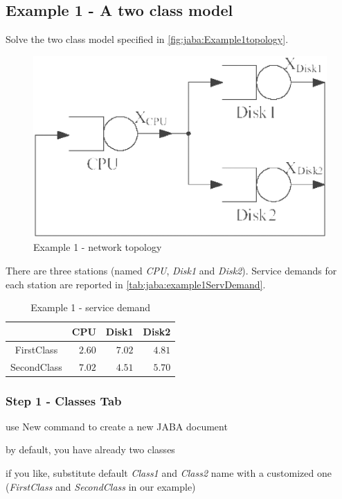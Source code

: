 \subsection{Example 1 - A two class model}
\label{sec:jaba:example1} Solve the two class model specified in
\autoref{fig:jaba:Example1topology}.
\begin{figure}[htbp]
    \begin{center}
        \includegraphics[scale=.35]{img/jaba/example1}
    \end{center}
    \caption{Example 1 - network topology}
    \label{fig:jaba:Example1topology}
\end{figure}

There are three stations (named
\emph{CPU}, \emph{Disk1} and \emph{Disk2}). 
Service demands for each station are reported in
\autoref{tab:jaba:example1ServDemand}.

\begin{table}[htbp]
\begin{center}
\begin{tabular}{c|r|r|r|}
& \multicolumn{1}{c|}{CPU} & \multicolumn{1}{c|}{Disk1} & \multicolumn{1}{c|}{Disk2} \\
\hline
FirstClass & $2.60$ & $7.02$ & $4.81$ \\
SecondClass & $7.02$ & $4.51$ & $5.70$ \\
\hline
\end{tabular}
\end{center}
\caption{Example 1 - service demand}
\label{tab:jaba:example1ServDemand}
\end{table}

\subsubsection{Step 1 - Classes Tab}
\begin{itemize*}
\item use New command to create a new JABA document
\item by default, you have already two classes
\item if you like, substitute default \emph{Class1} and \emph{Class2} name with a customized
one (\emph{FirstClass} and \emph{SecondClass} in our example)
\end{itemize*}


